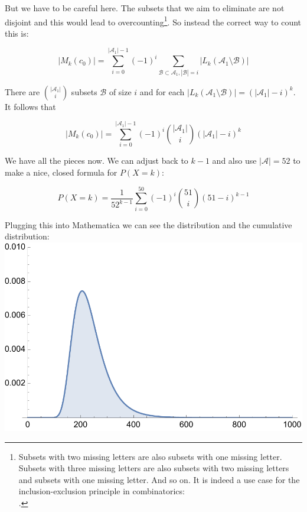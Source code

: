 But we have to be careful here. The subsets that we aim to eliminate are not disjoint and this would lead to overcounting\footnote{Subsets with two missing letters are also subsets with one missing letter. Subsets with three missing letters are also subsets with two missing letters and subsets with one missing letter. And so on. It is indeed a use case for the inclusion-exclusion principle in combinatorics: \\ .}. So instead the correct way to count this is:

$$
|M_k(c_0)| = \sum_{i = 0}^{|\mathcal{A}_1| - 1} (-1)^i \sum_{\mathcal{B} \subset \mathcal{A}_1, |\mathcal{B}|=i} |L_k(\mathcal{A}_1 \setminus \mathcal{B})|
$$

There are $\binom{|\mathcal{A}_1|}{i}$ subsets $\mathcal{B}$ of size $i$ and for each $|L_k(\mathcal{A}_1 \setminus \mathcal{B})| = (|\mathcal{A}_1| - i)^k$. It follows that

$$
|M_k(c_0)| = \sum_{i = 0}^{|\mathcal{A}_1| - 1} (-1)^i \binom{|\mathcal{A}_1|}{i} (|\mathcal{A}_1| - i)^k
$$

We have all the pieces now. We can adjust back to $k-1$ and also use $|\mathcal{A}|=52$ to make a nice, closed formula for $P(X=k)$:

$$
P(X=k) = \frac{1}{52^{k-1}} \sum_{i = 0}^{50} (-1)^i \binom{51}{i} (51 - i)^{k-1}
$$

Plugging this into Mathematica we can see the distribution and the cumulative distribution:\\


\includegraphics[scale=0.7]{probs.pdf}

